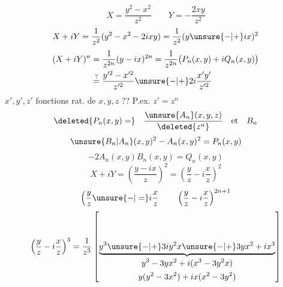 \[
X=\frac{y^2-x^2}{z^2}\qquad Y=-\frac{2xy}{z^2}
\]
\[
X+iY=\frac1{z^2}(y^2-x^2-2ixy)=\frac1{z^2}(y\unsure{-|+}ix)^2
\]
\[
\begin{aligned}
(X+iY)^n&=\frac1{z^{2n}}(y-ix)^{2n}
=\frac1{z^{2n}}\bigl(P_n(x,y)+iQ_n(x,y)\bigr)\\
&\overset{?}{=}\frac{y'^2-x'^2}{z'^2}\unsure{-|+}2i\frac{x'y'}{z'^2}
\end{aligned}
\]
$x',y',z'$ fonctions rat. de $x,y,z$ ?? P.ex. $z'=z^n$
\[
\deleted{P_n(x,y)=}\quad\frac{\unsure{A_n}(x,y,z)}{\deleted{z^n}}\quad\text{et}\quad B_n
\]
\[
\unsure{B_n|A_n}(x,y)^2-A_n(x,y)^2=P_n(x,y)
\]
\[
-2A_n(x,y)B_n(x,y)=Q_n(x,y)
\]
\[
X+iY=\left(\frac{y-ix}{z}\right)^2=\left(\frac yz-i\frac xz\right)^2
\]
\[
\left(\frac yz\unsure{-|=}i\frac xz\right.\qquad
\left(\frac yz-i\frac xz\right)^{2n+1}
\]
\[
\left(\frac yz-i\frac xz\right)^3
=\frac1{z^3}\left[
\underbrace{y^3\unsure{-|+}3iy^2x\unsure{-|+}3yx^2+ix^3}_{
\begin{gathered}
y^3-3yx^2+i(x^3-3y^2x)\\
y(y^2-3x^2)+ix(x^2-3y^2)
\end{gathered}}
\right]
\]
